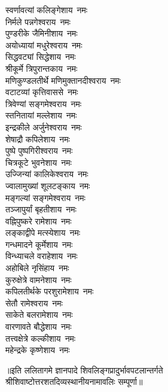 \begin{multicols}{2}
\begin{flushleft}
स्वर्णावत्यां कलिङ्गेशाय~नमः\\
निर्मले पन्नगेश्वराय~नमः\\
पुण्डरीके जैमिनीशाय~नमः\\
अयोध्यायां मधुरेश्वराय~नमः\\
सिद्धवट्यां सिद्धेशाय~नमः\\
श्रीकूर्मे त्रिपुरान्तकाय~नमः\\
मणिकुण्डलतीर्थे मणिमुक्तानदीश्वराय~नमः\\
वटाटव्यां कृत्तिवाससे~नमः\\
त्रिवेण्यां सङ्गमेश्वराय~नमः\\
स्तनितायां मल्लेशाय~नमः\hfill{}\\
इन्द्रकीले अर्जुनेश्वराय~नमः\\
शेषाद्रौ कपिलेशाय~नमः\\
पुष्पे पुष्पगिरीश्वराय~नमः\\
चित्रकूटे भुवनेशाय~नमः\\
उज्जिन्यां कालिकेश्वराय~नमः\\
ज्वालामुख्यां शूलटङ्काय~नमः\\
मङ्गल्यां सङ्गमेश्वराय~नमः\\
तञ्जापुर्यां बृहतीशाय~नमः\\
वह्निपुष्करे रामेशाय~नमः\\
लङ्काद्वीपे मत्स्येशाय~नमः\hfill{}\\
गन्धमादने कूर्मेशाय~नमः\\
विन्ध्याचले वराहेशाय~नमः\\
अहोबिले नृसिंहाय~नमः\\
कुरुक्षेत्रे वामनेशाय~नमः\\
कपिलतीर्थके परशुरामेशाय~नमः\\
सेतौ रामेश्वराय~नमः\\
साकेते बलरामेशाय~नमः\\
वारणावते बौद्धेशाय~नमः\\
तत्त्वक्षेत्रे कल्कीशाय~नमः\\
महेन्द्रके कृष्णेशाय~नमः\hfill{}\\
\end{flushleft}
\end{multicols}

॥इति ललितागमे ज्ञानपादे शिवलिङ्गप्रादुर्भावपटलान्तर्गते\\
 श्रीशिवाष्टोत्तरशतदिव्यस्थानीयनामावलिः सम्पूर्णा॥

